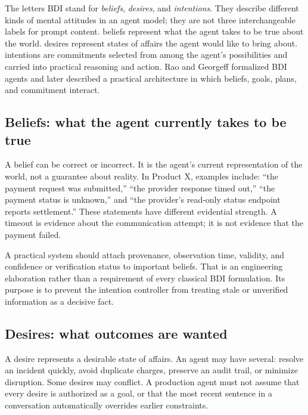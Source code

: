 The letters BDI stand for \emph{beliefs}, \emph{desires}, and \emph{intentions}. They describe different kinds of mental attitudes in an agent model; they are not three interchangeable labels for prompt content. \Glspl{belief} represent what the agent takes to be true about the world. \Glspl{desire} represent states of affairs the agent would like to bring about. \Glspl{intention} are commitments selected from among the agent's possibilities and carried into practical reasoning and action. Rao and Georgeff formalized BDI agents and later described a practical architecture in which beliefs, goals, plans, and commitment interact.\autocite{rao1991modelingbdi,rao1995bdi}

\subsection{Beliefs: what the agent currently takes to be true}

A \gls{belief} can be correct or incorrect. It is the agent's current representation of the world, not a guarantee about reality. In Product X, examples include: ``the payment request was submitted,'' ``the provider response timed out,'' ``the payment status is unknown,'' and ``the provider's read-only status endpoint reports settlement.'' These statements have different evidential strength. A timeout is evidence about the communication attempt; it is not evidence that the payment failed.

A practical system should attach provenance, observation time, validity, and confidence or verification status to important beliefs. That is an engineering elaboration rather than a requirement of every classical BDI formulation. Its purpose is to prevent the intention controller from treating stale or unverified information as a decisive fact.

\subsection{Desires: what outcomes are wanted}

A \gls{desire} represents a desirable state of affairs. An agent may have several: resolve an incident quickly, avoid duplicate charges, preserve an audit trail, or minimize disruption. Some desires may conflict. A production agent must not assume that every desire is authorized as a goal, or that the most recent sentence in a conversation automatically overrides earlier constraints.

